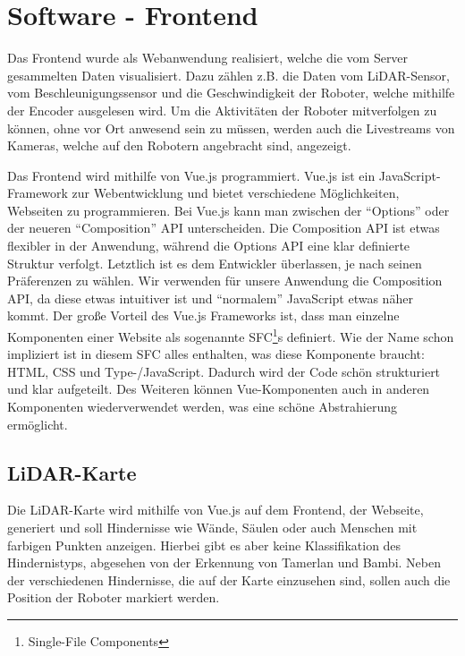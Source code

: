 
\chapter{Software - Frontend}
\label{sec:software_frontend}
Das Frontend wurde als Webanwendung realisiert,
welche die vom Server gesammelten Daten visualisiert.
%
Dazu zählen z.B. die Daten vom LiDAR-Sensor,
vom Beschleunigungssensor
und die Geschwindigkeit der Roboter,
welche mithilfe der Encoder ausgelesen wird.
%
Um die Aktivitäten der Roboter mitverfolgen zu können,
ohne vor Ort anwesend sein zu müssen,
werden auch die Livestreams von Kameras,
welche auf den Robotern angebracht sind,
angezeigt.

Das Frontend wird mithilfe von Vue.js programmiert.
%
Vue.js ist ein JavaScript-Framework zur Webentwicklung
und bietet verschiedene Möglichkeiten,
Webseiten zu programmieren.
%
Bei Vue.js kann man zwischen der ``Options'' oder
der neueren ``Composition'' API unterscheiden.
%
Die Composition API ist etwas flexibler in der Anwendung,
während die Options API eine klar definierte Struktur verfolgt.
%
Letztlich ist es dem Entwickler überlassen,
je nach seinen Präferenzen zu wählen.
%
Wir verwenden für unsere Anwendung die Composition API,
da diese etwas intuitiver ist
und ``normalem'' JavaScript etwas näher kommt. 
%
Der große Vorteil des Vue.js Frameworks ist,
dass man einzelne Komponenten einer Website
als sogenannte SFC\footnote{Single-File Components}s definiert.
%
Wie der Name schon impliziert ist in diesem SFC alles enthalten,
was diese Komponente braucht: HTML, CSS und Type-/JavaScript.
%
Dadurch wird der Code schön strukturiert und klar aufgeteilt.
%
Des Weiteren können Vue-Komponenten auch
in anderen Komponenten wiederverwendet werden,
was eine schöne Abstrahierung ermöglicht.

\section{LiDAR-Karte}
\label{subsec:frontend_lidar_map}
Die LiDAR-Karte wird mithilfe von Vue.js auf dem Frontend,
der Webseite,
generiert und soll Hindernisse wie Wände,
Säulen oder auch Menschen mit farbigen Punkten anzeigen.
%
Hierbei gibt es aber keine Klassifikation des Hindernistyps,
abgesehen von der Erkennung von Tamerlan und Bambi.
%
Neben der verschiedenen Hindernisse,
die auf der Karte einzusehen sind,
sollen auch die Position der Roboter markiert werden.

